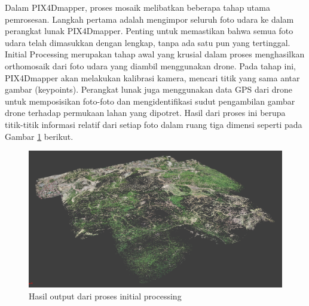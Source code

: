 \par Dalam PIX4Dmapper, proses mosaik melibatkan beberapa tahap utama pemrosesan. Langkah pertama adalah mengimpor seluruh foto udara ke dalam perangkat lunak PIX4Dmapper. Penting untuk memastikan bahwa semua foto udara telah dimasukkan dengan lengkap, tanpa ada satu pun yang tertinggal. Initial Processing merupakan tahap awal yang krusial dalam proses menghasilkan orthomosaik dari foto udara yang diambil menggunakan drone. Pada tahap ini, PIX4Dmapper akan melakukan kalibrasi kamera, mencari titik yang sama antar gambar (keypoints). Perangkat lunak juga menggunakan data GPS dari drone untuk memposisikan foto-foto dan mengidentifikasi sudut pengambilan gambar drone terhadap permukaan lahan yang dipotret. Hasil dari proses ini berupa titik-titik informasi relatif dari setiap foto dalam ruang tiga dimensi seperti pada Gambar \ref{hasil_initialprocessing} berikut.

\begin{figure} [H]
    \centering
    \includegraphics[width=1\linewidth]{image/initial processing.png}
    \caption{Hasil output dari proses initial processing}
    \label{hasil_initialprocessing}
\end{figure}

